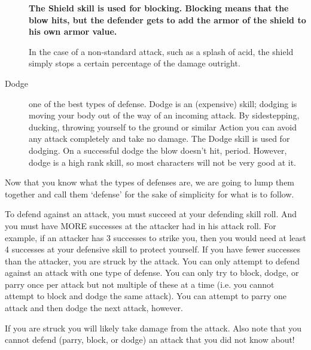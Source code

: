 \documentclass[twoside]{book}
\begin{document}
\begin{description}
{ \textbf{ The Shield skill is used for blocking. Blocking
                    means that the blow hits, but the defender gets to
                    add the armor of the shield to his own armor value.
                    }

  In the case of a non-standard attack, such
                    as a splash of acid, the shield simply stops a
                    certain percentage of the damage outright.
                
    }
  
  \item[ Dodge ] 
    {  
    one of the best types of defense. Dodge is an
                   (expensive) skill; dodging is moving your body out of
                   the way of an incoming attack. By sidestepping,
                   ducking, throwing yourself to the ground or similar
                   Action you can avoid any attack completely and take no
                   damage. The Dodge skill is used for dodging. On a
                   successful dodge the blow doesn't hit, period.
                   However, dodge is a high rank skill, so most
                   characters will not be very good at it. 
    }
  
\end{description}
  
    {  
    Now that you know what the types of defenses are, we
               are going to lump them together and call them
               `defense' for the sake of simplicity for what
               is to follow. 
    }
  
    {  
    To defend against an attack, you must succeed at
               your defending skill roll. And you must have MORE
               successes at the attacker had in his attack roll. For
               example, if an attacker has 3 successes to strike you,
               then you would need at least 4 successes at your defensive
               skill to protect yourself. If you have fewer successes
               than the attacker, you are struck by the attack. You can
               only attempt to defend against an attack with one type of
               defense. You can only try to block, dodge, or parry once
               per attack but not multiple of these at a time (i.e. you
               cannot attempt to block and dodge the same attack). You
               can attempt to parry one attack and then dodge the next
               attack, however. 
    }
  
    {  
    If you are struck you will likely take damage from
               the attack. Also note that you cannot defend (parry,
               block, or dodge) an attack that you did not know about!
               
    }
  
\end{document}
